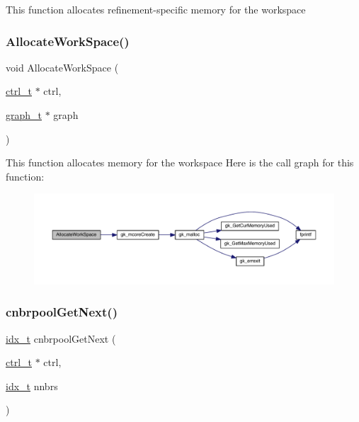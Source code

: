 This function allocates refinement-\/specific memory for the workspace \mbox{\label{a00981_a38986a3bdf3ee614ee37396e8f3c149b}} 
\subsubsection{\texorpdfstring{Allocate\+Work\+Space()}{AllocateWorkSpace()}}
{\footnotesize\ttfamily void Allocate\+Work\+Space (\begin{DoxyParamCaption}\item[{\hyperlink{a00742}{ctrl\+\_\+t} $\ast$}]{ctrl,  }\item[{\hyperlink{a00734}{graph\+\_\+t} $\ast$}]{graph }\end{DoxyParamCaption})}

This function allocates memory for the workspace Here is the call graph for this function\+:\nopagebreak
\begin{figure}[H]
\begin{center}
\leavevmode
\includegraphics[width=350pt]{a00981_a38986a3bdf3ee614ee37396e8f3c149b_cgraph}
\end{center}
\end{figure}
\mbox{\label{a00981_a5c7982f300512c943ce53a0531529ae8}} 
\subsubsection{\texorpdfstring{cnbrpool\+Get\+Next()}{cnbrpoolGetNext()}}
{\footnotesize\ttfamily \hyperlink{a00876_aaa5262be3e700770163401acb0150f52}{idx\+\_\+t} cnbrpool\+Get\+Next (\begin{DoxyParamCaption}\item[{\hyperlink{a00742}{ctrl\+\_\+t} $\ast$}]{ctrl,  }\item[{\hyperlink{a00876_aaa5262be3e700770163401acb0150f52}{idx\+\_\+t}}]{nnbrs }\end{DoxyParamCaption})}

